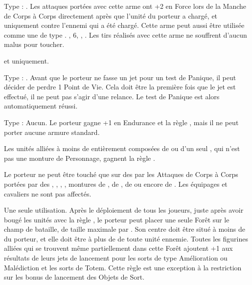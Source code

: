 Type : \hw{}. Les attaques portées avec cette arme ont +2 en Force lors de la Manche de Corps à Corps directement après que l'unité du porteur a chargé, et uniquement contre l'ennemi qui a été chargé. Cette arme peut aussi être utilisée comme une \textbf{\artilleryweapon} de type \textbf{\boltthrower}.\newline
{}, \Strength{} 6, , . Les tirs réalisés avec cette arme ne souffrent d'aucun malus pour toucher.

\soothsayers{} et \gnarledsoothsayers{} uniquement.

Type : \hw{}. Avant que le porteur ne fasse un jet pour un test de Panique, il peut décider de perdre 1 Point de Vie. Cela doit être la première fois que le jet est effectué, il ne peut pas s'agir d'une relance. Le test de Panique est alors automatiquement réussi.

\endpricelist

\armymagicalarmour

\startpricelist

Type : Aucun. Le porteur gagne +1 en Endurance et la règle , mais il ne peut porter aucune armure standard.

\endpricelist

\armytalismans

\startpricelist

Les unités alliées à moins de  entièrement composées de \razortusks{} ou d'un seul \chariot{}, qui n'est pas une monture de Personnage, gagnent la règle \vanguard{}.

Le porteur ne peut être touché que sur des  par les Attaques de Corps à Corps portées par des \swarms{}, \warbeasts{}, \monstrousbeasts{}, \monsters{}, montures de \cavalry{}, de \monstrouscavalry{}, de \riddenmonsters{} ou encore de \chariots{}. Les équipages et cavaliers ne sont pas affectés.

\endpricelist

\armyenchanteditems

\startpricelist

Une seule utilisation. Après le déploiement de tous les joueurs, juste après avoir bougé les unités avec la règle \vanguard{}, le porteur peut placer une seule Forêt sur le champ de bataille,  de taille maximale  par . Son centre doit être situé à moins de  du porteur, et elle doit être à plus de  de toute unité ennemie. Toutes les figurines alliées qui se trouvent même partiellement dans cette Forêt ajoutent +1 aux résultats de leurs jets de lancement pour les sorts de type Amélioration ou Malédiction et les sorts de Totem. Cette règle est une exception à la restriction sur les bonus de lancement des Objets de Sort.

